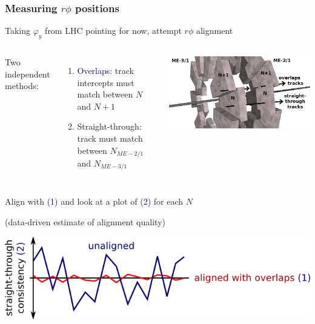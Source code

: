 \documentclass[compress]{beamer}
\begin{document}
\begin{frame}
\frametitle{Measuring $r\phi$ positions}
\small

\vspace{0.25 cm}
Taking $\varphi_y$ from LHC pointing for now, attempt $r\phi$ alignment

\vspace{0.5 cm}
\begin{columns}
Two independent methods:
\begin{enumerate}
\item \textcolor{darkblue}{Overlaps:} track intercepts must match between $N$ and $N+1$
\item Straight-through: track must match between $N_{ME-2/1}$ and $N_{ME-3/1}$
\end{enumerate}

\includegraphics[width=\linewidth]{overlaps_straight_through.png}
\end{columns}

\vspace{0.5 cm}
Align with \textcolor{darkblue}{(1)} and look at a plot of \textcolor{darkblue}{(2)} for each $N$

(data-driven estimate of alignment quality)

\begin{center}
\includegraphics[width=0.7\linewidth]{what_to_expect.png}
\end{center}
\end{frame}
\end{document}
